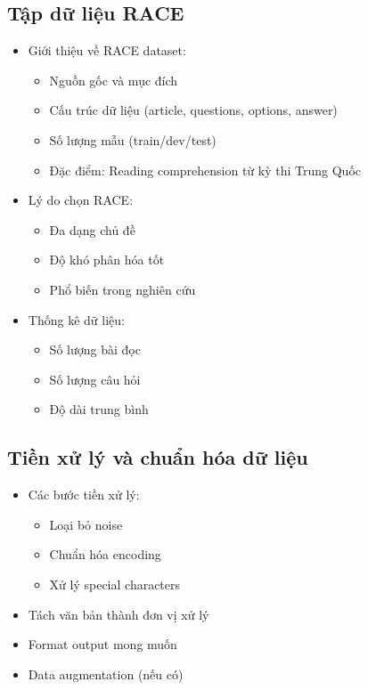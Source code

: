 \subsection{Tập dữ liệu RACE}
\begin{itemize}
    \item Giới thiệu về RACE dataset:
    \begin{itemize}
        \item Nguồn gốc và mục đích
        \item Cấu trúc dữ liệu (article, questions, options, answer)
        \item Số lượng mẫu (train/dev/test)
        \item Đặc điểm: Reading comprehension từ kỳ thi Trung Quốc
    \end{itemize}
    \item Lý do chọn RACE:
    \begin{itemize}
        \item Đa dạng chủ đề
        \item Độ khó phân hóa tốt
        \item Phổ biến trong nghiên cứu
    \end{itemize}
    \item Thống kê dữ liệu:
    \begin{itemize}
        \item Số lượng bài đọc
        \item Số lượng câu hỏi
        \item Độ dài trung bình
    \end{itemize}
\end{itemize}

\subsection{Tiền xử lý và chuẩn hóa dữ liệu}
\begin{itemize}
    \item Các bước tiền xử lý:
    \begin{itemize}
        \item Loại bỏ noise
        \item Chuẩn hóa encoding
        \item Xử lý special characters
    \end{itemize}
    \item Tách văn bản thành đơn vị xử lý
    \item Format output mong muốn
    \item Data augmentation (nếu có)
\end{itemize}

